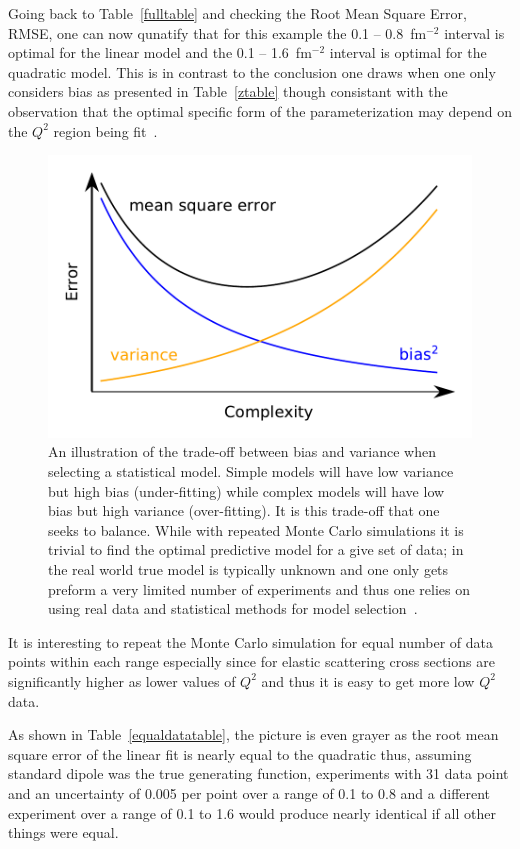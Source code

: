 \documentclass[10pt,aps,prc,twocolumn]{revtex4-1}
\begin{document}
Going back to Table~\ref{fulltable} and checking the Root Mean Square Error, RMSE, one can now qunatify 
that for this example the 0.1 -- 0.8~fm$^{-2}$ interval is optimal for the linear model and the 0.1 -- 1.6~fm$^{-2}$ 
interval is optimal for the quadratic model. 
This is in contrast to the conclusion one draws when one only considers bias as presented in Table~\ref{ztable}
though consistant with the observation that the optimal specific form of the parameterization 
may depend on the $Q^2$ region being fit~\cite{Alberico:2008sz}.
\begin{figure}
\label{biasvariance}
\includegraphics[width=\columnwidth]{Figure/biasvariance-clean.pdf}
\caption{An illustration of the trade-off between bias and variance when selecting a statistical model.   Simple models
will have low variance but high bias (under-fitting) while complex models will have low bias but high variance (over-fitting).   
It is this trade-off that one seeks to balance.   While with repeated  Monte Carlo simulations it is trivial to find the optimal
predictive model for a give set of data; in the real world true model is typically unknown and one only gets preform a 
very limited number of experiments and thus one relies on using real data and statistical methods for 
model selection~\cite{Hastie:2009}.}
\end{figure}

It is interesting to repeat the Monte Carlo simulation for equal number of data points within each range
especially since for elastic scattering cross sections are significantly higher as lower values of $Q^2$
and thus it is easy to get more low $Q^2$ data.

As shown in Table~\ref{equaldatatable}, the picture is even grayer as the root mean square error of the linear 
fit is nearly equal to the quadratic thus, assuming standard dipole was the true generating function,  experiments
with 31 data point and an uncertainty of 0.005 per point over a range of 0.1 to 0.8 and a different experiment
over a range of 0.1 to 1.6 would produce nearly identical if all other things were equal.
\end{document}
